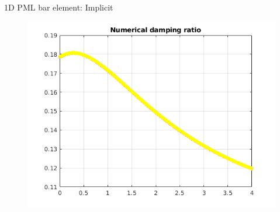 \begin{frame}{1D PML bar element: Implicit}
\begin{figure}[ht]
\begin{minipage}[b]{0.5\linewidth}
  \end{minipage}%
  \begin{minipage}[b]{0.5\linewidth}
    \centering
    \includegraphics[scale=.35]{images/pml1d-imp-4.png} \\

  \end{minipage} 
\end{figure}
\end{frame}

